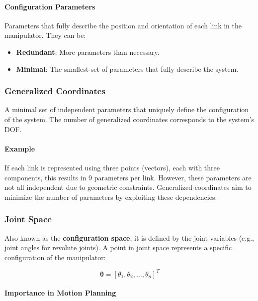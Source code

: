 \documentclass{article}
\begin{document}
\paragraph{Configuration Parameters}

Parameters that fully describe the position and orientation of each link in the manipulator. They can be:

\begin{itemize}
    \item \textbf{Redundant}: More parameters than necessary.
    \item \textbf{Minimal}: The smallest set of parameters that fully describe the system.
\end{itemize}

\subsubsection{Generalized Coordinates}

A minimal set of independent parameters that uniquely define the configuration of the system. The number of generalized coordinates corresponds to the system's DOF.

\paragraph{Example}

If each link is represented using three points (vectors), each with three components, this results in 9 parameters per link. However, these parameters are not all independent due to geometric constraints. Generalized coordinates aim to minimize the number of parameters by exploiting these dependencies.

\subsubsection{Joint Space}

Also known as the \textbf{configuration space}, it is defined by the joint variables (e.g., joint angles for revolute joints). A point in joint space represents a specific configuration of the manipulator:

$$
\bm{\theta} = [\theta_1, \theta_2, \dots, \theta_n]^T
$$

\paragraph{Importance in Motion Planning}
\end{document}
